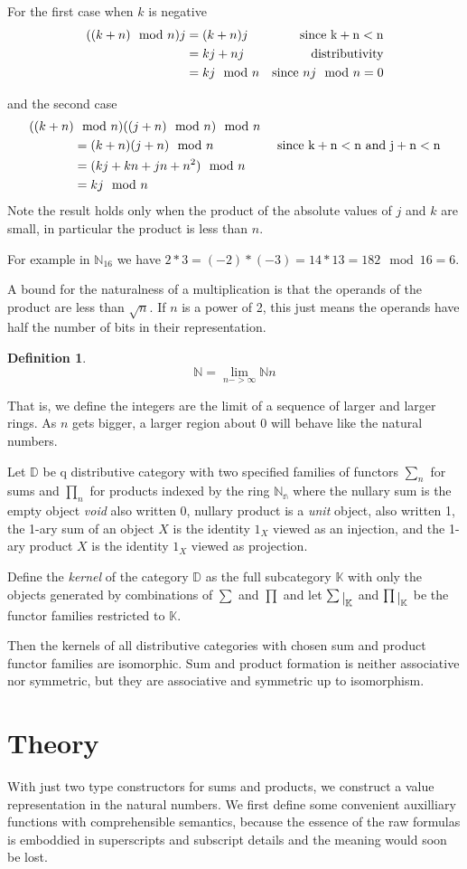 \documentclass{article}
\newtheorem{definition}{Definition}
\def\restrict#1{\raise-.5ex\hbox{\ensuremath|}_{#1}}
\begin{document}
For the first case when $k$ is negative
\begin{align*}
((k + n) \mod n)j &= (k + n)j&\rm{since\ } k+n<n\\
  &= kj+nj &{\rm distributivity}\\
  &= kj \mod n &{\rm since\ }nj \mod n = 0
\end{align*}

and the second case
\begin{align*}
((k+n) &\mod n)((j+n) \mod n) \mod n \\
&= (k+n)(j+n)\mod n&\rm{\ since\ } k+n < n{\ and \ }j+n<n\\
 &=(kj + kn + jn + n^2)\mod n\\
 &= kj \mod n
\end{align*}
Note the result holds only when the product of the absolute
values of $j$ and $k$ are small, in particular the product
is less than $n$.

For example in $\mathbb{N}_{16}$ we have $2*3 = (-2)*(-3)=14*13=182\mod 16 = 6$.

A bound for the naturalness of a multiplication is that the operands of
the product are less than $\sqrt{n}$. If $n$ is a power of 2, this just means
the operands have half the number of bits in their representation.


\begin{definition}
$$ \mathbb{N} = \lim_{n->\infty}\mathbb{N}n$$
\end{definition}
That is, we define the integers are the limit of a sequence of larger and larger rings.
As $n$ gets bigger, a larger region about 0 will behave like the natural numbers.

Let $\mathbb{D}$ be q distributive category with two specified families of functors
$\sum_n$ for sums and $\prod_n$ for products indexed by the ring $\mathbb{N_n}$ where
the nullary sum is the empty object {\em void} also written 0, nullary product
is a {\em unit} object, also written 1, 
the 1-ary sum of an object $X$ is the identity $1_X$ viewed as an injection,
and the 1-ary product $X$ is the identity $1_X$ viewed as projection.

Define the {\em kernel} of the category $\mathbb{D}$ as the full subcategory
$\mathbb{K}$ with only the objects generated by combinations of $\sum$ and $\prod$
and let $\sum\restrict{\mathbb{K}}$ and 
$\prod\restrict{\mathbb{K}}$  be the functor families restricted to $\mathbb{K}$.

Then the kernels of all distributive categories with chosen sum and product
functor families are isomorphic. Sum and product formation is neither associative
nor symmetric, but they are associative and symmetric up to isomorphism.

\section{Theory}
With just two type constructors for sums and products, we construct a value
representation in the natural numbers. We first define some convenient 
auxilliary functions with comprehensible semantics, because the essence
of the raw formulas is emboddied in superscripts and subscript details
and the meaning would soon be lost.
\end{document}
